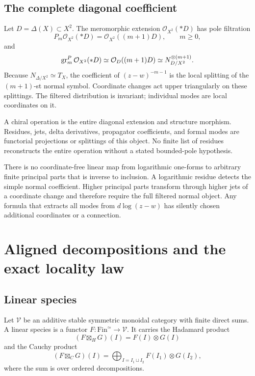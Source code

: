 \section{The complete diagonal coefficient}
Let \(D=\Delta(X)\subset X^2\).  The meromorphic extension \(\mathcal O_{X^2}(*D)\) has pole filtration
\[
 P_m\mathcal O_{X^2}(*D)=\mathcal O_{X^2}((m+1)D),\qquad m\ge0,
\]
and
\[
 \operatorname{gr}_m^P\mathcal O_{X^2}(*D)\simeq
 \mathcal O_D((m+1)D)\simeq N_{D/X^2}^{\otimes(m+1)}.
\]
Because \(N_{\Delta/X^2}\simeq T_X\), the coefficient of \((z-w)^{-m-1}\) is the local splitting of the \((m+1)\)-st normal symbol.  Coordinate changes act upper triangularly on these splittings.  The filtered distribution is invariant; individual modes are local coordinates on it.

\begin{proposition}
A chiral operation is the entire diagonal extension and structure morphism.  Residues, jets, delta derivatives, propagator coefficients, and formal modes are functorial projections or splittings of this object.  No finite list of residues reconstructs the entire operation without a stated bounded-pole hypothesis.
\end{proposition}

\begin{nogobox}[title={No-go theorem 2: no universal logarithmic extractor}]
There is no coordinate-free linear map from logarithmic one-forms to arbitrary finite principal parts that is inverse to inclusion.  A logarithmic residue detects the simple normal coefficient.  Higher principal parts transform through higher jets of a coordinate change and therefore require the full filtered normal object.  Any formula that extracts all modes from \(d\log(z-w)\) has silently chosen additional coordinates or a connection.
\end{nogobox}

\chapter{Aligned decompositions and the exact locality law}\label{chap:aligned}

\section{Linear species}
Let \(\mathcal V\) be an additive stable symmetric monoidal category with finite direct sums.  A linear species is a functor \(F:\mathrm{Fin}^{\simeq}\to\mathcal V\).  It carries the Hadamard product
\[
 (F\boxtimes_HG)(I)=F(I)\otimes G(I)
\]
and the Cauchy product
\[
 (F\boxtimes_CG)(I)=\bigoplus_{I=I_1\sqcup I_2}F(I_1)\otimes G(I_2),
\]
where the sum is over ordered decompositions.

